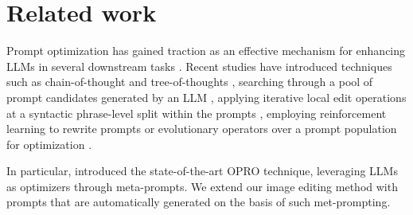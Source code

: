 \section{Related work}
Prompt optimization has gained traction as an effective mechanism for enhancing LLMs in several downstream tasks \cite{lester2021power,srivastava2023beyond}.
Recent studies have introduced techniques such as chain-of-thought \cite{wei2022chain} and tree-of-thoughts \cite{yao2024tree}, searching through a pool of prompt candidates generated by an LLM \cite{zhou2022large}, applying iterative local edit operations at a syntactic phrase-level split within the prompts \cite{prasad2023grips}, employing reinforcement learning to rewrite prompts \cite{kong2024prewrite} or evolutionary operators over a prompt population for optimization \cite{guo2023connecting}.

In particular, \citet{yang2023large} introduced the state-of-the-art OPRO technique, leveraging LLMs as optimizers through meta-prompts. %
We extend our image editing method with prompts that are automatically generated on the basis of such met-prompting.